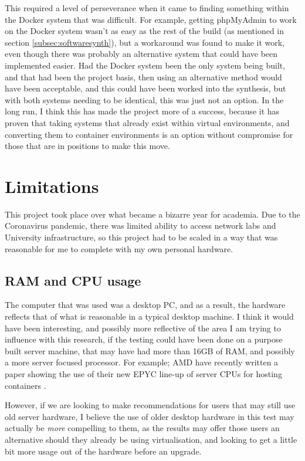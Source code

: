 This required a level of perseverance when it came to finding something within the Docker system that was difficult. For example, getting phpMyAdmin to work on the Docker system wasn't as easy as the rest of the build (as mentioned in section \ref{subsec:softwaresynth}), but a workaround was found to make it work, even though there was probably an alternative system that could have been implemented easier. Had the Docker system been the only system being built, and that had been the project basis, then using an alternative method would have been acceptable, and this could have been worked into the synthesis, but with both systems needing to be identical, this was just not an option. In the long run, I think this has made the project more of a success, because it has proven that taking systems that already exist within virtual environments, and converting them to container environments is an option without compromise for those that are in positions to make this move.

\section{Limitations}%
\label{HardwareLimitations}
This project took place over what became a bizarre year for academia. Due to the Coronavirus pandemic, there was limited ability to access network labs and University infrastructure, so this project had to be scaled in a way that was reasonable for me to complete with my own personal hardware.

\subsection{RAM and CPU usage}
\label{RAMCPU}
The computer that was used was a desktop PC, and as a result, the hardware reflects that of what is reasonable in a typical desktop machine. I think it would have been interesting, and possibly more reflective of the area I am trying to influence with this research, if the testing could have been done on a purpose built server machine, that may have had more than 16GB of RAM, and possibly a more server focused processor. For example; AMD have recently written a paper showing the use of their new EPYC line-up of server CPUs for hosting containers \citep{amdcontainers}.

However, if we are looking to make recommendations for users that may still use old server hardware, I believe the use of older desktop hardware in this test may actually be \emph{more} compelling to them, as the results may offer those users an alternative should they already be using virtualisation, and looking to get a little bit more usage out of the hardware before an upgrade.

